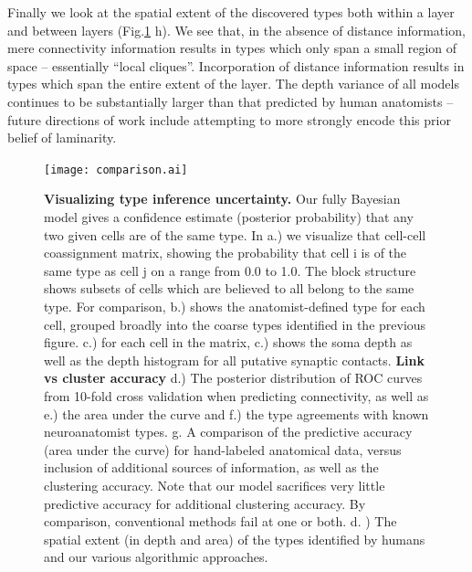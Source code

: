\documentclass{article}
\begin{document}
{Finally we look at the spatial extent of the discovered types both
within a layer and between layers (Fig.\ref{fig:mouseretina_compare}
h). We see that, in the absence of distance information, mere
connectivity information results in types which only span a small
region of space -- essentially “local cliques”. Incorporation of
distance information results in types which span the entire extent of
the layer. The depth variance of all models continues to be
substantially larger than that predicted by human anatomists -- future
directions of work include attempting to more strongly encode this
prior belief of laminarity.


\begin{figure}
  \centering 
  \centerline{\texttt{[image: comparison.ai]}}
  \caption{\textbf{Visualizing type inference uncertainty.} Our fully
    Bayesian model gives a confidence estimate (posterior probability)
    that any two given cells are of the same type. In a.) we visualize
    that cell-cell coassignment matrix, showing the probability that
    cell i is of the same type as cell j on a range from 0.0 to
    1.0. The block structure shows subsets of cells which are believed
    to all belong to the same type. For comparison, b.) shows the
    anatomist-defined type for each cell, grouped broadly into the
    coarse types identified in the previous figure. c.) for each cell
    in the matrix, c.) shows the soma depth as well as the depth
    histogram for all putative synaptic contacts. \textbf{Link vs
      cluster accuracy} d.) The posterior distribution of ROC curves
    from 10-fold cross validation when predicting connectivity, as
    well as e.) the area under the curve and f.) the type agreements
    with known neuroanatomist types. g. A comparison of the predictive
    accuracy (area under the curve) for hand-labeled anatomical data,
    versus inclusion of additional sources of information, as well as
    the clustering accuracy. Note that our model sacrifices very
    little predictive accuracy for additional clustering accuracy. By
    comparison, conventional methods fail at one or both.  d. ) The
    spatial extent (in depth and area) of the types identified by
    humans and our various algorithmic approaches.}
\label{fig:mouseretina_compare}
\end{figure}



}
\end{document}
